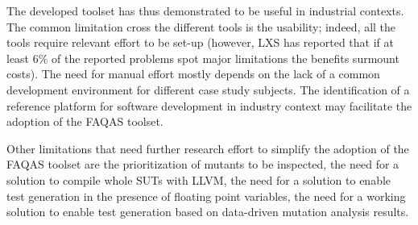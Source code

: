 The developed toolset has thus demonstrated to be useful in industrial contexts. The common limitation cross the different tools is the usability; indeed, all the tools require relevant effort to be set-up (however, LXS has reported that if at least 6\% of the reported problems spot major limitations the benefits surmount costs). The need for manual effort mostly depends on the lack of a common development environment for different case study subjects. The identification of a reference platform for software development in industry context may facilitate the adoption of the FAQAS toolset.

Other limitations that need further research effort to simplify the adoption of the FAQAS toolset are the prioritization of mutants to be inspected, the need for a solution to compile whole SUTs with LLVM, the need for a solution to enable test generation in the presence of floating point variables, the need for a working solution to enable test generation based on data-driven mutation analysis results. 

